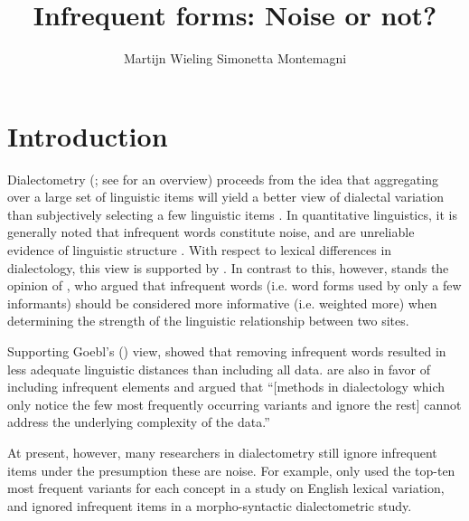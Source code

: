 \documentclass[output=paper]{LSP/langsci}
\author{Martijn Wieling\affiliation{University of Groningen, CLCG} \lastand  Simonetta Montemagni\affiliation{Istituto di Linguistica Computazionale “Antonio Zampolli”, ILC-CNR}}
\title{Infrequent forms: Noise or not?}
\begin{document}
  

 

\section{Introduction}
Dialectometry (\citealt{seguy_relation_1971}; see \citealt{wieling_advances_2015} for an overview) proceeds from the idea that aggregating over a large set of linguistic items will yield a better view of dialectal variation than subjectively selecting a few linguistic items \citep[190--191]{nerbonne_data-driven_2009}.  In quantitative linguistics, it is generally noted that infrequent words constitute noise, and are unreliable evidence of linguistic structure \citep[199]{manning_foundations_1999}. With respect to lexical differences in dialectology, this view is supported by \citet[17]{carver_american_1987}. In contrast to this, however, stands the opinion of \citet[Vol I: 83--86]{goebl_dialektometrische_1984}, who argued that infrequent words (i.e. word forms used by only a few informants) should be considered more informative (i.e. weighted more) when determining the strength of the linguistic relationship between two sites.

Supporting Goebl's (\citeyear{goebl_dialektometrische_1984}) view, \citet{nerbonne_toward_2007} showed that removing infrequent words resulted in less adequate linguistic distances than including all data. \citet[173]{kretzschmar_scaled_2013} are also in favor of including infrequent elements and argued that ``[methods in dialectology which only notice the few most frequently occurring variants and ignore the rest] cannot address the underlying complexity of the data.''

At present, however, many researchers in dialectometry still ignore infrequent items under the presumption these are noise. For example, \citet{wieling_analyzing_2014} only used the top-ten most frequent variants for each concept in a study on English lexical variation, and \citet{szmrecsanyi_corpus-based_2011} ignored infrequent items in a morpho-syntactic dialectometric study. 
\end{document}
